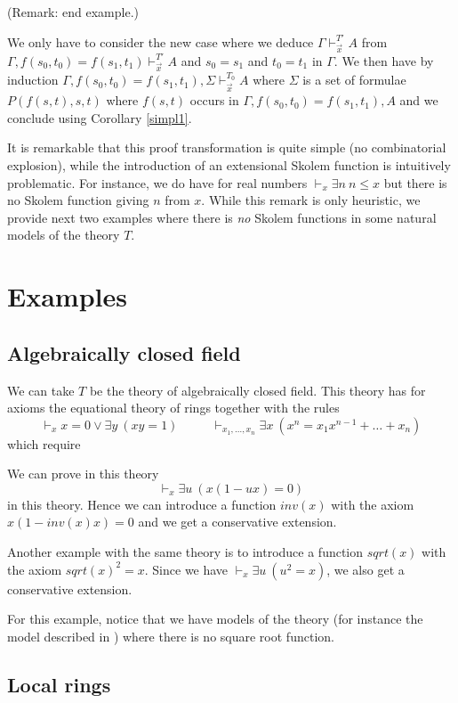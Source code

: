 \documentclass[10pt,a4paper]{article}
\begin{document}
\noindent
(Remark: end example.)

 We only have to consider the new case where we deduce $\Gamma\vdash_{\vec{x}}^{T'} A$ from 
$\Gamma,f(s_0,t_0) = f(s_1,t_1)\vdash_{\vec{x}}^{T'} A$ and $s_0 = s_1$ and
$t_0 = t_1$ in $\Gamma$. We then have by induction
$\Gamma,f(s_0,t_0) = f(s_1,t_1),\Sigma \vdash_{\vec{x}}^{T_0} A$
where  $\Sigma$ is a set of formulae $P(f(s,t),s,t)$ where $f(s,t)$ occurs
in $\Gamma,f(s_0,t_0) = f(s_1,t_1),A$ and we conclude using Corollary \ref{simpl1}.

\medskip

 It is remarkable that this proof transformation is quite simple (no combinatorial explosion), while
the introduction of an extensional Skolem function is intuitively problematic. For instance,
we do have for real numbers $\vdash_x \exists n~n\leqslant x$ but there is no Skolem function
giving $n$ from $x$. While this remark is only heuristic, we provide next two examples where there
is {\em no} Skolem functions in some natural models of the theory $T$.

\section{Examples}

\subsection{Algebraically closed field}

 We can take $T$ be the theory of algebraically closed field. This theory
has for axioms the equational theory of rings together with the rules
$$
\vdash_x x = 0 \vee \exists y~(xy = 1)~~~~~~~~~~~~
\vdash_{x_1,\dots,x_n} \exists x~(x^n = x_1 x^{n-1} + \dots + x_n)
$$which require

 We can prove in this theory
$$
\vdash_{x} \exists u~ (x(1-ux) = 0)
$$
in this theory. Hence we can introduce a function $inv(x)$ with the axiom
$x(1 -inv(x) x) = 0$ and we get a conservative extension. 

 Another example with the same theory is to introduce a function $sqrt(x)$ with the axiom
$sqrt(x)^2 = x$. Since we have $\vdash_{x} \exists u~(u^2 = x)$, we also get a conservative
extension.

 For this example, notice that we have models of the theory (for instance the model described
in \cite{Mannaa}) where there is no square root function.

\subsection{Local rings}
\end{document}

